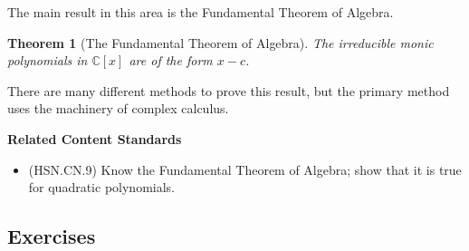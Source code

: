 \documentclass[
]{book}
\providecommand{\tightlist}{%
  \setlength{\itemsep}{0pt}\setlength{\parskip}{0pt}}
\newenvironment{standards}{}{}
\newtheorem{theorem}{Theorem}[chapter]
\theoremstyle{definition}
\theoremstyle{definition}
\theoremstyle{definition}
\theoremstyle{definition}
\theoremstyle{remark}
\begin{document}
The main result in this area is the Fundamental Theorem of Algebra.

\begin{theorem}[The Fundamental Theorem of Algebra]
The irreducible monic polynomials in \(\mathbb{C}[x]\) are of the form \(x-c\).
\end{theorem}

There are many different methods to prove this result, but the primary method uses the machinery of complex calculus.

\begin{standards}

\begin{center}
\textbf{Related Content Standards}

\end{center}

\begin{itemize}
\tightlist
\item
  (HSN.CN.9) Know the Fundamental Theorem of Algebra; show that it is true for quadratic polynomials.
\end{itemize}

\end{standards}

\hypertarget{exercises-26}{%
\subsection{Exercises}\label{exercises-26}}
\end{document}

